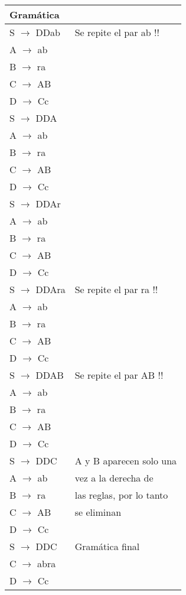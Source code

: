 \begin{minipage}[t]{0.5\textwidth}

\begin{tabular}{|l|l|}
\hline
Gramática &  \\
\hline
S $\rightarrow$ DDab  & Se repite el par ab !! \\ 
A $\rightarrow$ ab & \\
B $\rightarrow$ ra & \\
C $\rightarrow$ AB & \\
D $\rightarrow$ Cc & \\
\hline
S $\rightarrow$ DDA  & \\ 
A $\rightarrow$ ab & \\
B $\rightarrow$ ra & \\
C $\rightarrow$ AB & \\
D $\rightarrow$ Cc & \\
\hline
S $\rightarrow$ DDAr  & \\ 
A $\rightarrow$ ab & \\
B $\rightarrow$ ra & \\
C $\rightarrow$ AB & \\
D $\rightarrow$ Cc & \\
\hline
S $\rightarrow$ DDAra  & Se repite el par ra !! \\ 
A $\rightarrow$ ab & \\
B $\rightarrow$ ra & \\
C $\rightarrow$ AB & \\
D $\rightarrow$ Cc & \\
\hline
S $\rightarrow$ DDAB  &  Se repite el par AB !! \\ 
A $\rightarrow$ ab & \\
B $\rightarrow$ ra & \\
C $\rightarrow$ AB & \\
D $\rightarrow$ Cc & \\
\hline
S $\rightarrow$ DDC  &  A y B aparecen solo una \\ 
A $\rightarrow$ ab &  vez a la derecha de  \\
B $\rightarrow$ ra & las reglas, por lo tanto \\
C $\rightarrow$ AB & se eliminan \\
D $\rightarrow$ Cc & \\
\hline
S $\rightarrow$ DDC  &  Gramática final\\
C $\rightarrow$ abra & \\
D $\rightarrow$ Cc & \\
\hline
\end{tabular}
\end{minipage}

